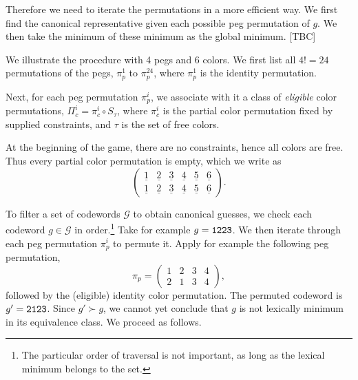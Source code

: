 Therefore we need to iterate the permutations in a more efficient way. We first find the canonical representative given each possible peg permutation of $g$. We then take the minimum of these minimum as the global minimum. [TBC]

We illustrate the procedure with 4 pegs and 6 colors. We first list all $4! = 24$ permutations of the pegs, $\pi_p^1$ to $\pi_p^{24}$, where $\pi_p^1$ is the identity permutation.

Next, for each peg permutation $\pi_p^i$, we associate with it a class of \emph{eligible} color permutations, $\Pi_c^i = \pi_c^i \circ S_\tau$, where $\pi_c^i$ is the partial color permutation fixed by supplied constraints, and $\tau$ is the set of free colors. 

At the beginning of the game, there are no constraints, hence all colors are free. Thus every partial color permutation is empty, which we write as
\[
\begin{pmatrix}
\underline{1} & \underline{2} & \underline{3} & \underline{4} & \underline{5} & \underline{6} \\
\underline{1} & \underline{2} & \underline{3} & \underline{4} & \underline{5} & \underline{6} 
\end{pmatrix} .
\]

To filter a set of codewords $\mathcal{G}$ to obtain canonical guesses, we check each codeword $g \in \mathcal{G}$ in order.\footnote{The particular order of traversal is not important, as long as the lexical minimum belongs to the set.} 
Take for example $g = \texttt{1223}$. We then iterate through each peg permutation $\pi_p^i$ to permute it. Apply for example the following peg permutation,
\[
\pi_p = 
\begin{pmatrix}
1 & 2 & 3 & 4 \\
2 & 1 & 3 & 4
\end{pmatrix} ,
\]
followed by the (eligible) identity color permutation.
The permuted codeword is $g' = \texttt{2123}$. Since $g' \succ g$, we cannot yet conclude that $g$ is not lexically minimum in its equivalence class. We proceed as follows.

